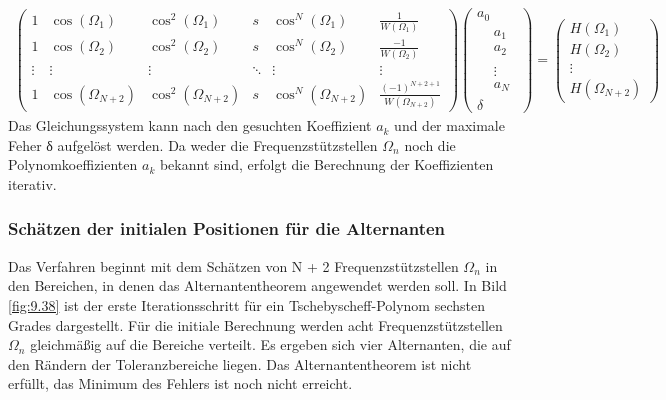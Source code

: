 \begin{align}
\begin{pmatrix}
1 & \cos\left( \Omega_{1} \right) & \cos^{2}\left( \Omega_{1} \right) & s & \cos^{N}\left( \Omega_{1} \right) & \frac{1}{W\left( \Omega_{1} \right)} \\
1 & \cos\left( \Omega_{2} \right) & \cos^{2}\left( \Omega_{2} \right) & s & \cos^{N}\left( \Omega_{2} \right) & \frac{- 1}{W\left( \Omega_{2} \right)} \\
 \vdots & \vdots & \vdots & \ddots & \vdots & \vdots \\
1 & \cos\left( \Omega_{N + 2} \right) & \cos^{2}\left( \Omega_{N + 2} \right) & s & \cos^{N}\left( \Omega_{N + 2} \right) & \frac{( - 1)^{N + 2 + 1}}{W\left( \Omega_{N + 2} \right)}
\end{pmatrix}  \begin{pmatrix}
a_{0} \\
\begin{aligned}
 & a_{1} \\
 & a_{2}
\end{aligned} \\
\begin{aligned}
 & \vdots \\
 & a_{N}
\end{aligned} \\
\delta
\end{pmatrix} = \begin{pmatrix}
H\left( \Omega_{1} \right) \\
H\left( \Omega_{2} \right) \\
 \vdots \\
H\left( \Omega_{N + 2} \right)
\end{pmatrix} \label{eq:9.148}
\end{align}
Das Gleichungssystem kann nach den gesuchten Koeffizient \(a_{k}\) und der maximale Feher δ aufgelöst werden. Da weder die Frequenzstützstellen \(Ω_{n}\) noch die Polynomkoeffizienten \(a_{k}\) bekannt sind, erfolgt die Berechnung der Koeffizienten iterativ.

\subsubsection{Schätzen der initialen Positionen für die Alternanten}\label{sec:schuxe4tzen-der-initialen-positionen-fuxfcr-die-alternanten}

Das Verfahren beginnt mit dem Schätzen von N + 2 Frequenzstützstellen \(Ω_{n}\) in den Bereichen, in denen das Alternantentheorem angewendet werden soll. In Bild \ref{fig:9.38} ist der erste Iterationsschritt für ein Tschebyscheff-Polynom sechsten Grades dargestellt. Für die initiale Berechnung werden acht Frequenzstützstellen \(Ω_{n}\) gleichmäßig auf die Bereiche verteilt. Es ergeben sich vier Alternanten, die auf den Rändern der Toleranzbereiche liegen. Das Alternantentheorem ist nicht erfüllt, das Minimum des Fehlers ist noch nicht erreicht.

